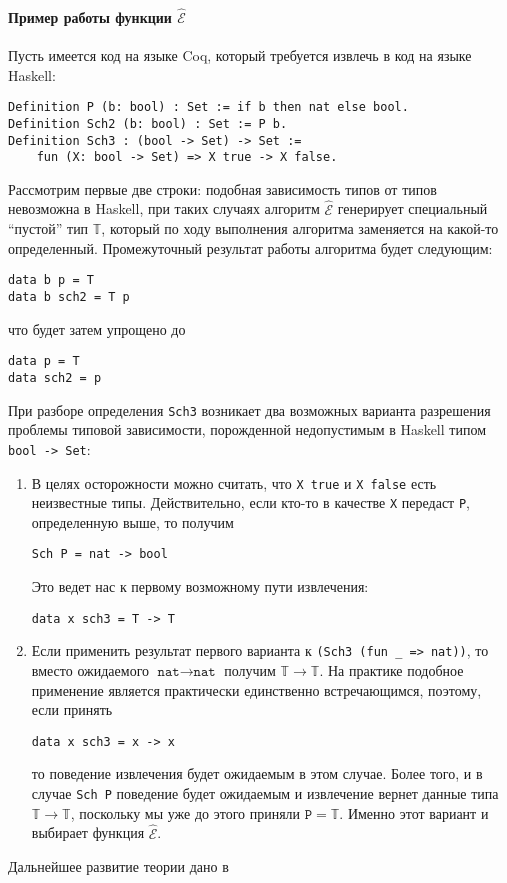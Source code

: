 \paragraph{Пример работы функции $\hat{\mathcal{E}}$}
Пусть имеется код на языке Coq, который требуется извлечь в код на языке Haskell:
\begin{Verbatim}[fontsize=\small]
Definition P (b: bool) : Set := if b then nat else bool.
Definition Sch2 (b: bool) : Set := P b.
Definition Sch3 : (bool -> Set) -> Set :=
	fun (X: bool -> Set) => X true -> X false.
\end{Verbatim}

Рассмотрим первые две строки: подобная зависимость типов от типов невозможна в Haskell, при таких случаях алгоритм $\hat{\mathcal{E}}$ генерирует специальный ``пустой'' тип $\mathbb{T}$, который по ходу выполнения алгоритма заменяется на какой-то определенный. Промежуточный результат работы алгоритма будет следующим:
\begin{Verbatim}[fontsize=\small]
data b p = T
data b sch2 = T p
\end{Verbatim}
что будет затем упрощено до
\begin{Verbatim}[fontsize=\small]
data p = T
data sch2 = p
\end{Verbatim}

При разборе определения \texttt{Sch3} возникает два возможных варианта разрешения проблемы типовой зависимости, порожденной недопустимым в Haskell типом \texttt{bool -> Set}:
\begin{enumerate}
\item В целях осторожности можно считать, что \texttt{X true} и \texttt{X false} есть неизвестные типы. Действительно, если кто-то в качестве \texttt{X} передаст \texttt{P}, определенную выше, то получим
\begin{Verbatim}[fontsize=\small]
Sch P = nat -> bool
\end{Verbatim} 
Это ведет нас к первому возможному пути извлечения:
\begin{Verbatim}[fontsize=\small]
data x sch3 = T -> T
\end{Verbatim}
\item  Если применить результат первого варианта к \texttt{(Sch3 (fun \_ => nat))}, то вместо ожидаемого $\texttt{nat} \rightarrow \texttt{nat}$ получим $\mathbb{T} \rightarrow \mathbb{T}$. На практике подобное применение является практически единственно встречающимся, поэтому, если принять
\begin{Verbatim}[fontsize=\small]
data x sch3 = x -> x
\end{Verbatim}
то поведение извлечения будет ожидаемым в этом случае. Более того, и в случае \texttt{Sch P} поведение будет ожидаемым и извлечение вернет данные типа $\mathbb{T} \rightarrow \mathbb{T}$, поскольку мы уже до этого приняли $\texttt{P} = \mathbb{T}$. Именно этот вариант и выбирает функция $\hat{\mathcal{E}}$.
\end{enumerate}
Дальнейшее развитие теории дано в~\autocite{Pierre2004}

